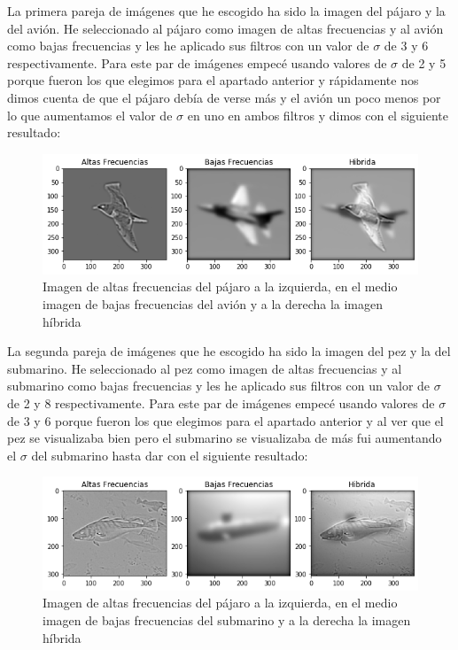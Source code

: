 \documentclass[12pt,spanish]{article}
\begin{document}
La primera pareja de imágenes que he escogido ha sido la imagen del pájaro y la del avión. He seleccionado al pájaro como imagen de altas frecuencias y al avión como bajas frecuencias y les he aplicado sus filtros con un valor de $\sigma$ de 3 y 6 respectivamente. Para este par de imágenes empecé usando valores de $\sigma$ de 2 y 5 porque fueron los que elegimos para el apartado anterior y rápidamente nos dimos cuenta de que el pájaro debía de verse más y el avión un poco menos por lo que aumentamos el valor de $\sigma$ en uno en ambos filtros y dimos con el siguiente resultado:

\begin{figure}[H]
	\includegraphics[width=\textwidth]{./imagenes_memoria/b1b}
	\caption{Imagen de altas frecuencias del pájaro a la izquierda, en el medio imagen de bajas frecuencias del avión y a la derecha la imagen híbrida}
	\label{bonus1ba}
\end{figure}
	
La segunda pareja de imágenes que he escogido ha sido la imagen del pez y la del submarino. He seleccionado al pez como imagen de altas frecuencias y al submarino como bajas frecuencias y les he aplicado sus filtros con un valor de $\sigma$ de 2 y 8 respectivamente. Para este par de imágenes empecé usando valores de $\sigma$ de 3 y 6 porque fueron los que elegimos para el apartado anterior y al ver que el pez se visualizaba bien pero el submarino se visualizaba de más fui aumentando el $\sigma$ del submarino hasta dar con el siguiente resultado:

\begin{figure}[H]
	\includegraphics[width=\textwidth]{./imagenes_memoria/bonus1bb}
	\caption{Imagen de altas frecuencias del pájaro a la izquierda, en el medio imagen de bajas frecuencias del submarino y a la derecha la imagen híbrida}
	\label{bonus1bb}
\end{figure}
	
\end{document}
